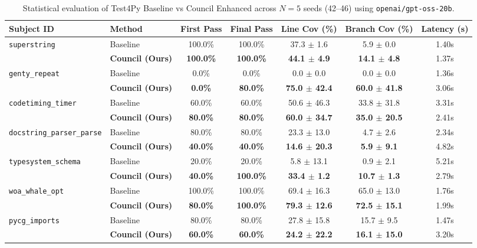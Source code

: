 \begin{table}[t]
\centering
\small
\caption{Statistical evaluation of Test4Py Baseline vs Council Enhanced across $N=5$ seeds (42--46) using \texttt{openai/gpt-oss-20b}.}
\label{tab:statistical_n5_eval}
\begin{tabular}{ll c c c c c}
\toprule
\textbf{Subject ID} & \textbf{Method} & \textbf{First Pass} & \textbf{Final Pass} & \textbf{Line Cov (\%)} & \textbf{Branch Cov (\%)} & \textbf{Latency (s)} \\
\midrule
\multirow{2}{*}{\texttt{superstring}} & Baseline & 100.0\% & 100.0\% & 37.3 $\pm$ 1.6 & 5.9 $\pm$ 0.0 & 1.40s \\
 & \textbf{Council (Ours)} & \textbf{100.0\%} & \textbf{100.0\%} & \textbf{44.1 $\pm$ 4.9} & \textbf{14.1 $\pm$ 4.8} & 1.37s \\
\midrule
\multirow{2}{*}{\texttt{genty_repeat}} & Baseline & 0.0\% & 0.0\% & 0.0 $\pm$ 0.0 & 0.0 $\pm$ 0.0 & 1.36s \\
 & \textbf{Council (Ours)} & \textbf{0.0\%} & \textbf{80.0\%} & \textbf{75.0 $\pm$ 42.4} & \textbf{60.0 $\pm$ 41.8} & 3.06s \\
\midrule
\multirow{2}{*}{\texttt{codetiming_timer}} & Baseline & 60.0\% & 60.0\% & 50.6 $\pm$ 46.3 & 33.8 $\pm$ 31.8 & 3.31s \\
 & \textbf{Council (Ours)} & \textbf{80.0\%} & \textbf{80.0\%} & \textbf{60.0 $\pm$ 34.7} & \textbf{35.0 $\pm$ 20.5} & 2.41s \\
\midrule
\multirow{2}{*}{\texttt{docstring_parser_parse}} & Baseline & 80.0\% & 80.0\% & 23.3 $\pm$ 13.0 & 4.7 $\pm$ 2.6 & 2.34s \\
 & \textbf{Council (Ours)} & \textbf{40.0\%} & \textbf{40.0\%} & \textbf{14.6 $\pm$ 20.3} & \textbf{5.9 $\pm$ 9.1} & 4.82s \\
\midrule
\multirow{2}{*}{\texttt{typesystem_schema}} & Baseline & 20.0\% & 20.0\% & 5.8 $\pm$ 13.1 & 0.9 $\pm$ 2.1 & 5.21s \\
 & \textbf{Council (Ours)} & \textbf{40.0\%} & \textbf{100.0\%} & \textbf{33.4 $\pm$ 1.2} & \textbf{10.7 $\pm$ 1.3} & 2.79s \\
\midrule
\multirow{2}{*}{\texttt{woa_whale_opt}} & Baseline & 100.0\% & 100.0\% & 69.4 $\pm$ 16.3 & 65.0 $\pm$ 13.0 & 1.76s \\
 & \textbf{Council (Ours)} & \textbf{80.0\%} & \textbf{100.0\%} & \textbf{79.3 $\pm$ 12.6} & \textbf{72.5 $\pm$ 15.1} & 1.99s \\
\midrule
\multirow{2}{*}{\texttt{pycg_imports}} & Baseline & 80.0\% & 80.0\% & 27.8 $\pm$ 15.8 & 15.7 $\pm$ 9.5 & 1.47s \\
 & \textbf{Council (Ours)} & \textbf{60.0\%} & \textbf{60.0\%} & \textbf{24.2 $\pm$ 22.2} & \textbf{16.1 $\pm$ 15.0} & 3.20s \\
\midrule
\bottomrule
\end{tabular}
\end{table}
